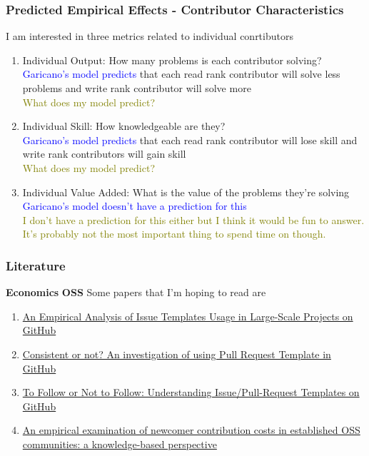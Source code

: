 \documentclass[source/paper/main.tex]{subfiles}
\begin{document}
\subsubsection{Predicted Empirical Effects - Contributor Characteristics}
I am interested in three metrics related to individual conrtibutors
\begin{enumerate}
    \item Individual Output: How many problems is each contributor solving?\\
    \textcolor{blue}{Garicano's model predicts } that each read rank contributor will solve less problems and write rank contributor will solve more\\
    \textcolor{olive}{What does my model predict?}
    \item Individual Skill: How knowledgeable are they? \\
    \textcolor{blue}{Garicano's model predicts } that each read rank contributor will lose skill and write rank contributors will gain skill\\
    \textcolor{olive}{What does my model predict?}
    \item Individual Value Added: What is the value of the problems they're solving\\
    \textcolor{blue}{Garicano's model doesn't have a prediction for this}\\
    \textcolor{olive}{I don't have a prediction for this either but I think it would be fun to answer. It's probably not the most important thing to spend time on though.}
\end{enumerate}


\subsubsection{Literature} 
\textbf{Economics}
\textbf{OSS}
Some papers that I'm hoping to read are
\begin{enumerate}
    \item \hyperlink{https://dl.acm.org/doi/10.1145/3643673}{An Empirical Analysis of Issue Templates Usage in Large-Scale Projects on GitHub}
    \item \hyperlink{https://doi.org/10.1016/j.infsof.2021.106797}{Consistent or not? An investigation of using Pull Request Template in GitHub}
    \item \hyperlink{https://doi.org/10.1109/TSE.2022.3224053}{To Follow or Not to Follow: Understanding Issue/Pull-Request Templates on GitHub}
    \item \hyperlink{source/literature/e2120n2.pdf}{An empirical examination of newcomer contribution costs in established OSS communities: a knowledge-based perspective}
\end{enumerate}
\end{document}
